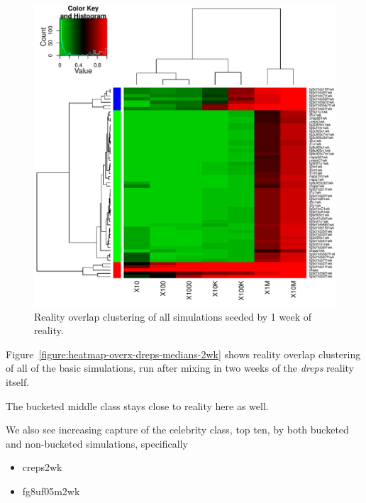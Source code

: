 \documentclass[10pt,oneside]{memoir}
\begin{document}
\begin{Spacing}{2}
\begin{figure}
\begin{center}
    \includegraphics{figures/heatmap-overx-dreps-medians-1wk}
    \caption{Reality overlap clustering of all simulations seeded by 1 week of reality.}
    \label{figure:heatmap-overx-dreps-medians-1wk}
\end{center}
\end{figure}
Figure~\ref{figure:heatmap-overx-dreps-medians-2wk} shows reality overlap clustering of all of the basic simulations, run after mixing in two weeks of the {\itshape dreps} reality itself.


The bucketed middle class stays close to reality here as well.


We also see increasing capture of the celebrity class, top ten, by both bucketed and non-bucketed simulations, specifically


\begin{itemize}


\item creps2wk

\item fg8uf05m2wk
\end{itemize}



\end{Spacing}
\end{document}
